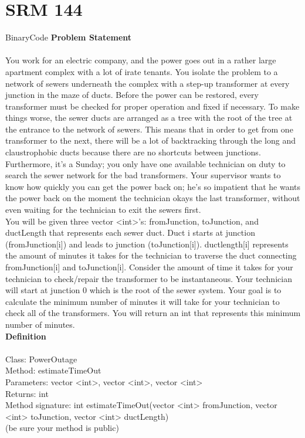 \documentclass[a4j,10pt,oneside,openany]{jsbook}
\begin{document}
\section{SRM 144}
\begin{breakitembox}[l]{BinaryCode}
{\bf Problem Statement}\\\\
You work for an electric company, and the power goes out in a rather large apartment complex with a lot of irate tenants. You isolate the problem to a network of sewers underneath the complex with a step-up transformer at every junction in the maze of ducts. Before the power can be restored, every transformer must be checked for proper operation and fixed if necessary. To make things worse, the sewer ducts are arranged as a tree with the root of the tree at the entrance to the network of sewers. This means that in order to get from one transformer to the next, there will be a lot of backtracking through the long and claustrophobic ducts because there are no shortcuts between junctions. Furthermore, it's a Sunday; you only have one available technician on duty to search the sewer network for the bad transformers. Your supervisor wants to know how quickly you can get the power back on; he's so impatient that he wants the power back on the moment the technician okays the last transformer, without even waiting for the technician to exit the sewers first.\\
You will be given three vector <int>'s: fromJunction, toJunction, and ductLength that represents each sewer duct. Duct i starts at junction (fromJunction[i]) and leads to junction (toJunction[i]). ductlength[i] represents the amount of minutes it takes for the technician to traverse the duct connecting fromJunction[i] and toJunction[i]. Consider the amount of time it takes for your technician to check/repair the transformer to be instantaneous. Your technician will start at junction 0 which is the root of the sewer system. Your goal is to calculate the minimum number of minutes it will take for your technician to check all of the transformers. You will return an int that represents this minimum number of minutes.\\
{\bf Definition}\\\\
Class: PowerOutage\\
Method: estimateTimeOut\\
Parameters: vector <int>, vector <int>, vector <int>\\
Returns: int\\
Method signature: int estimateTimeOut(vector <int> fromJunction, vector <int> toJunction, vector <int> ductLength)\\
(be sure your method is public)\\


\end{breakitembox}
\end{document}
